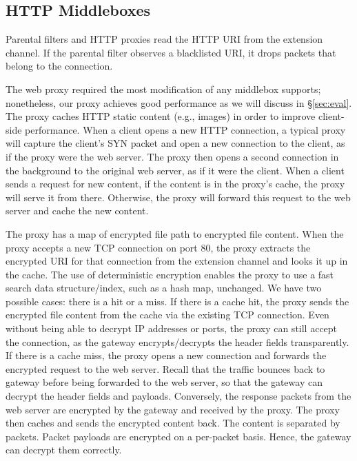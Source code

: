 \subsection{HTTP Middleboxes}
Parental filters and HTTP proxies read the HTTP URI from the extension channel. 
If the parental filter observes a blacklisted URI, it drops packets that belong to the connection.

The web proxy required the most modification of any middlebox \sys supports; nonetheless, our proxy achieves good performance as we will discuss in \S\ref{sec:eval}.
The proxy caches HTTP static content (e.g., images) in order to improve client-side performance. 
When a client opens a new HTTP connection, a typical proxy will capture the client's SYN packet and open a new connection to the client, as if the proxy were the web server. The proxy then opens a second connection in the background to the original web server, as if it were the client. 
When a client sends a request for new content, if the content is in the proxy's cache, the proxy will serve it from there. Otherwise, the proxy will forward this request to the web server and cache the new content. 

The proxy has a map of encrypted file path to encrypted file content. When the proxy accepts a new TCP connection on port 80, the proxy extracts the encrypted URI for that connection from the extension channel and looks it up in the cache. The use of deterministic encryption enables the proxy to use a fast search data structure/index, such as a hash map, unchanged. We have two possible cases: there is a hit or a miss. If there is a cache hit, the proxy sends the encrypted file content from the cache via the existing TCP connection. Even without being able to decrypt IP addresses or ports, the proxy can still accept the connection, as the gateway encrypts/decrypts the header fields transparently.
If there is a cache miss, the proxy opens a new connection and forwards the encrypted request to the web server. Recall that the traffic bounces back to gateway before being forwarded to the web server, so that the gateway can decrypt the header fields and payloads. Conversely, the response packets from the web server are encrypted by the gateway and received by the proxy. The proxy then caches and sends the encrypted content back. The content is separated by packets. Packet payloads are encrypted on a per-packet basis. Hence, the gateway can decrypt them correctly.


